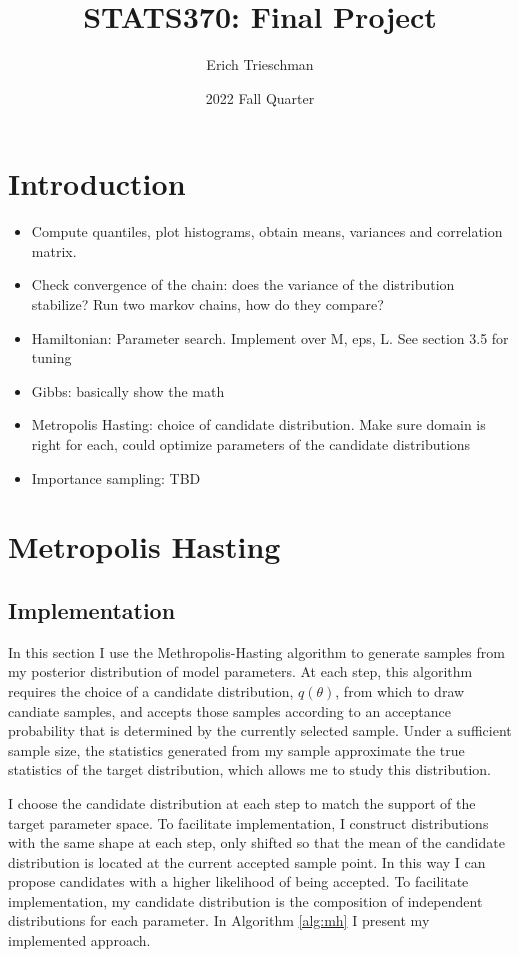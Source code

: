 \documentclass{article}
\title{STATS370: Final Project}
\author{Erich Trieschman}
\date{2022 Fall Quarter}
\begin{document}
\maketitle


\section*{Introduction}
\begin{itemize}
  \item Compute quantiles, plot histograms, obtain means, variances and correlation matrix.
  \item Check convergence of the chain: does the variance of the distribution stabilize? Run two markov chains, how do they compare?
  \item Hamiltonian: Parameter search. Implement over M, eps, L. See section 3.5 for tuning
  \item Gibbs: basically show the math
  \item Metropolis Hasting: choice of candidate distribution. Make sure domain is right for each, could optimize parameters of the candidate distributions
  \item Importance sampling: TBD
\end{itemize}

\section{Metropolis Hasting}
\label{sec:MH}
\subsection{Implementation}
In this section I use the Methropolis-Hasting algorithm to generate samples from my posterior distribution of model parameters. At each step, this algorithm requires the choice of a candidate distribution, $q(\theta)$, from which to draw candiate samples, and accepts those samples according to an acceptance probability that is determined by the currently selected sample. Under a sufficient sample size, the statistics generated from my sample approximate the true statistics of the target distribution, which allows me to study this distribution. 

I choose the candidate distribution at each step to match the support of the target parameter space. To facilitate implementation, I construct distributions with the same shape at each step, only shifted so that the mean of the candidate distribution is located at the current accepted sample point. In this way I can propose candidates with a higher likelihood of being accepted. To facilitate implementation, my candidate distribution is the composition of independent distributions for each parameter. In Algorithm \ref{alg:mh} I present my implemented approach.
\end{document}
